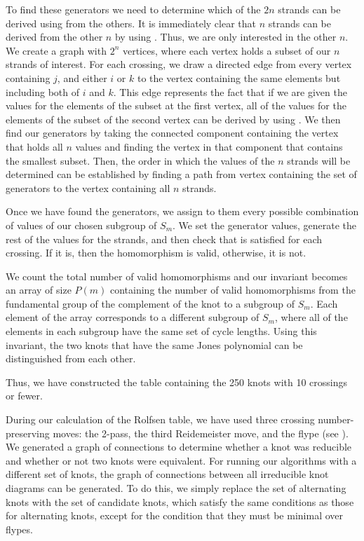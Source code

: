 \begin{paper}
To find these generators we need to determine which of the $2n$ strands can be
derived using \eqBoth from the others.
It is immediately clear that $n$ strands can be derived from the other $n$ by
using \eqUpper.
Thus, we are only interested in the other $n$.
We create a graph with $2^n$ vertices, where each vertex holds a subset of our
$n$ strands of interest.
For each crossing, we draw a directed edge from every vertex containing $j$, and
either $i$ or $k$ to the vertex containing the same elements but including both
of $i$ and $k$.
This edge represents the fact that if we are given the values for the elements
of the subset at the first vertex, all of the values for the elements of the
subset of the second vertex can be derived by using \eqBoth.
We then find our generators by taking the connected component containing the
vertex that holds all $n$ values and finding the vertex in that component that
contains the smallest subset.
Then, the order in which the values of the $n$ strands will be determined can be
established by finding a path from vertex containing the set of generators to
the vertex containing all $n$ strands.


Once we have found the generators, we assign to them every possible
combination of values of our chosen subgroup of $S_m$.
We set the generator values, generate the rest of the values for the strands,
and then check that \eqBoth is satisfied for each crossing.
If it is, then the homomorphism is valid, otherwise, it is not.


We count the total number of valid homomorphisms and our invariant becomes an
array of size $P(m)$ containing the number of valid homomorphisms from the
fundamental group of the complement of the knot to a subgroup of $S_m$.
Each element of the array corresponds to a different subgroup of $S_m$, where
all of the elements in each subgroup have the same set of cycle lengths.
Using this invariant, the two knots that have the same Jones polynomial can be
distinguished from each other.


Thus, we have constructed the table containing the 250 knots with 10 crossings
or fewer.



During our calculation of the Rolfsen table, we have used three crossing
number-preserving moves: the 2-pass, the third Reidemeister move, and the flype
(see \figMoves).
We generated a graph of connections to determine whether a knot was reducible
and whether or not two knots were equivalent.
For running our algorithms with a different set of knots, the graph of
connections between all irreducible knot diagrams can be generated.
To do this, we simply replace the set of alternating knots with the set of
candidate knots, which satisfy the same conditions as those for alternating
knots, except for the condition that they must be minimal over flypes.


\end{paper}
